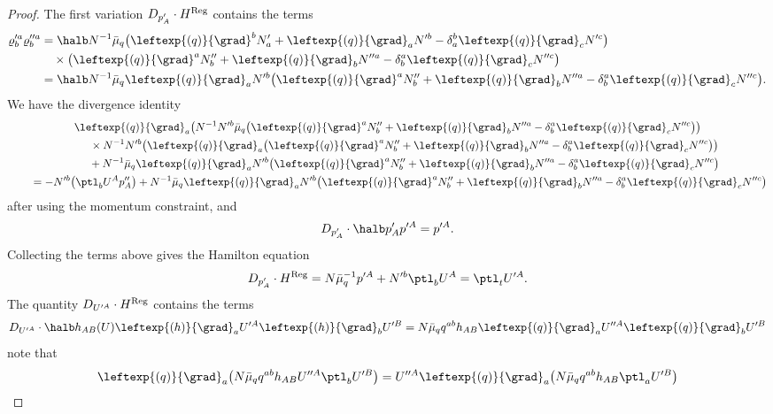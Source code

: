 \begin{proof}
The first variation $D_{p'_A} \cdot H^{{\rm Reg}}$ contains the terms
\begin{align*}
\varrho'^a_b \varrho''^a_b &{}= \halb N^{-1} \bar{\mu}_q \bigl(\leftexp{(q)}{\grad}^b N'_a + \leftexp{(q)}{\grad}_a N'^b - \delta_a^b \leftexp{(q)}{\grad}_c N'^c\bigr) \notag\\
&\quad{}{} \times \bigl(\leftexp{(q)}{\grad}^a N''_b + \leftexp{(q)}{\grad}_b N''^a - \delta_b^a \leftexp{(q)}{\grad}_c N''^c\bigr) \notag\\
&{}= \halb N^{-1} \bar{\mu}_q \leftexp{(q)}{\grad}_a N'^b \bigl(\leftexp{(q)}{\grad}^a N''_b + \leftexp{(q)}{\grad}_b N''^a - \delta_b^a \leftexp{(q)}{\grad}_c N''^c\bigr).
\end{align*}
We have the divergence identity
\begin{gather*}
 \leftexp{(q)}{\grad}_a \bigl(N^{-1} N'^b \bar{\mu}_q \bigl(\leftexp{(q)}{\grad}^a N''_b + \leftexp{(q)}{\grad}_b N''^a - \delta_b^a \leftexp{(q)}{\grad}_c N''^c\bigr)\bigr) \notag\\
\qquad\quad{}\times N^{-1} N'^b \bigl(\leftexp{(q)}{\grad}_a \bigl(\leftexp{(q)}{\grad}^a N''_b + \leftexp{(q)}{\grad}_b N''^a - \delta_b^a \leftexp{(q)}{\grad}_c N''^c\bigr)\bigr) \notag\\
\qquad\quad{}+ N^{-1} \bar{\mu}_q \leftexp{(q)}{\grad}_a N'^b \bigl(\leftexp{(q)}{\grad}^a N''_b + \leftexp{(q)}{\grad}_b N''^a - \delta_b^a \leftexp{(q)}{\grad}_c N''^c\bigr) \notag\\
\qquad{}= -N'^b \bigl(\ptl_b U^A p''_A\bigr) + N^{-1} \bar{\mu}_q \leftexp{(q)}{\grad}_a N'^b \bigl(\leftexp{(q)}{\grad}^a N''_b + \leftexp{(q)}{\grad}_b N''^a - \delta_b^a \leftexp{(q)}{\grad}_c N''^c\bigr)
\end{gather*}
after using the momentum constraint, and
\begin{align*}
D_{p'_A} \cdot \halb p'_A p'^A = p'^A.
\end{align*}
Collecting the terms above gives the Hamilton equation
\begin{align*}
D_{p'_A} \cdot H^{{\rm Reg}} = N \bar{\mu}^{-1}_q p'^A + N'^b \ptl_b U^A
= \ptl_t U'^A.
\end{align*}
The quantity $D_{U'^A} \cdot H^{{\rm Reg}}$ contains the terms
\[
D_{U'^A} \cdot \halb h_{AB}(U) \leftexp{(h)}{\grad}_a U'^A \leftexp{(h)}{\grad}_b U'^B = N \bar{\mu}_q q^{ab} h_{AB} \leftexp{(q)}{\grad}_a U''^A \leftexp{(q)}{\grad}_b U'^B \]
note that
\begin{align*}
\leftexp{(q)}{\grad}_a \bigl(N \bar{\mu}_q q^{ab} h_{AB} U''^A \ptl_b U'^B\bigr)&{}= U''^A \leftexp{(q)}{\grad}_a \bigl(N \bar{\mu}_q q^{ab} h_{AB} \ptl_a U'^B\bigr) \\

\end{align*}
\end{proof}
